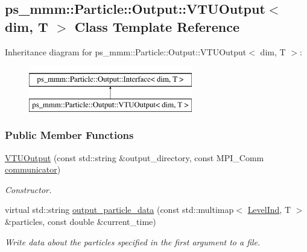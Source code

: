 \hypertarget{classps__mmm_1_1_particle_1_1_output_1_1_v_t_u_output}{}\subsection{ps\+\_\+mmm\+:\+:Particle\+:\+:Output\+:\+:V\+T\+U\+Output$<$ dim, T $>$ Class Template Reference}
\label{classps__mmm_1_1_particle_1_1_output_1_1_v_t_u_output}
Inheritance diagram for ps\+\_\+mmm\+:\+:Particle\+:\+:Output\+:\+:V\+T\+U\+Output$<$ dim, T $>$\+:\begin{figure}[H]
\begin{center}
\leavevmode
\includegraphics[height=2.000000cm]{classps__mmm_1_1_particle_1_1_output_1_1_v_t_u_output}
\end{center}
\end{figure}
\subsubsection*{Public Member Functions}
\begin{DoxyCompactItemize}
\item 
\hyperlink{classps__mmm_1_1_particle_1_1_output_1_1_v_t_u_output_a7c9137646ffb5d56e476fb701f222609}{V\+T\+U\+Output} (const std\+::string \&output\+\_\+directory, const M\+P\+I\+\_\+\+Comm \hyperlink{classps__mmm_1_1_particle_1_1_output_1_1_interface_ae3fcfd82092c40864ec09918f03b91d0}{communicator})
\begin{DoxyCompactList}\small\item\em Constructor. \end{DoxyCompactList}\item 
virtual std\+::string \hyperlink{classps__mmm_1_1_particle_1_1_output_1_1_v_t_u_output_a636fd4e2dce491f0abbea649f8ee2e7a}{output\+\_\+particle\+\_\+data} (const std\+::multimap$<$ \hyperlink{namespaceps__mmm_1_1_particle_a475174140997ceb63cc9e801b6c0c4b8}{Level\+Ind}, T $>$ \&particles, const double \&current\+\_\+time)
\begin{DoxyCompactList}\small\item\em Write data about the particles specified in the first argument to a file. \end{DoxyCompactList}\end{DoxyCompactItemize}
